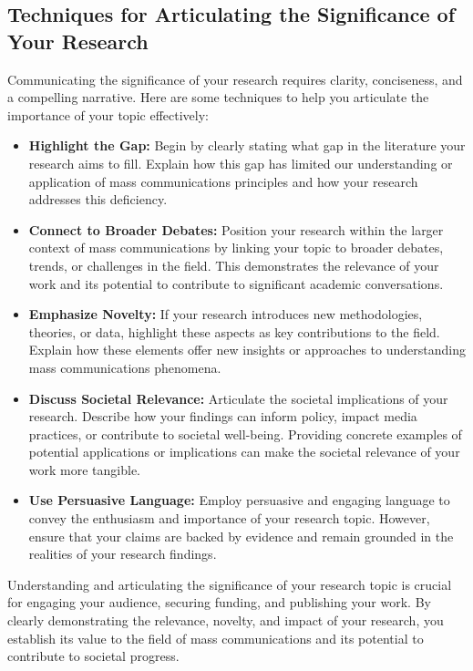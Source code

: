\documentclass[
]{book}
\begin{document}
\hypertarget{techniques-for-articulating-the-significance-of-your-research}{%
\subsection*{Techniques for Articulating the Significance of Your Research}\label{techniques-for-articulating-the-significance-of-your-research}}

Communicating the significance of your research requires clarity, conciseness, and a compelling narrative. Here are some techniques to help you articulate the importance of your topic effectively:

\begin{itemize}
\item
  \textbf{Highlight the Gap:} Begin by clearly stating what gap in the literature your research aims to fill. Explain how this gap has limited our understanding or application of mass communications principles and how your research addresses this deficiency.
\item
  \textbf{Connect to Broader Debates:} Position your research within the larger context of mass communications by linking your topic to broader debates, trends, or challenges in the field. This demonstrates the relevance of your work and its potential to contribute to significant academic conversations.
\item
  \textbf{Emphasize Novelty:} If your research introduces new methodologies, theories, or data, highlight these aspects as key contributions to the field. Explain how these elements offer new insights or approaches to understanding mass communications phenomena.
\item
  \textbf{Discuss Societal Relevance:} Articulate the societal implications of your research. Describe how your findings can inform policy, impact media practices, or contribute to societal well-being. Providing concrete examples of potential applications or implications can make the societal relevance of your work more tangible.
\item
  \textbf{Use Persuasive Language:} Employ persuasive and engaging language to convey the enthusiasm and importance of your research topic. However, ensure that your claims are backed by evidence and remain grounded in the realities of your research findings.
\end{itemize}

Understanding and articulating the significance of your research topic is crucial for engaging your audience, securing funding, and publishing your work. By clearly demonstrating the relevance, novelty, and impact of your research, you establish its value to the field of mass communications and its potential to contribute to societal progress.
\end{document}
